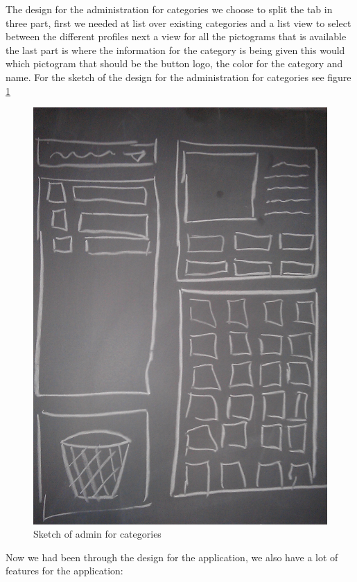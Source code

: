 The design for the administration for categories we choose to split the tab in three part, first we needed at list over existing categories and a list view to select between the different profiles next a view for all the pictograms that is available the last part is where the information for the category is being given this would which pictogram that should be the button logo, the color for the category and name. For the sketch of the design for the administration for categories see figure \ref{fig:admincate} 
\begin{figure}[htbp]
	\centering
		\includegraphics[scale=0.10]{input/images/admincate.jpg}
	\caption{Sketch of admin for categories}
	\label{fig:admincate}
\end{figure}

Now we had been through the design for the application, we also have a lot of features for the application: 

